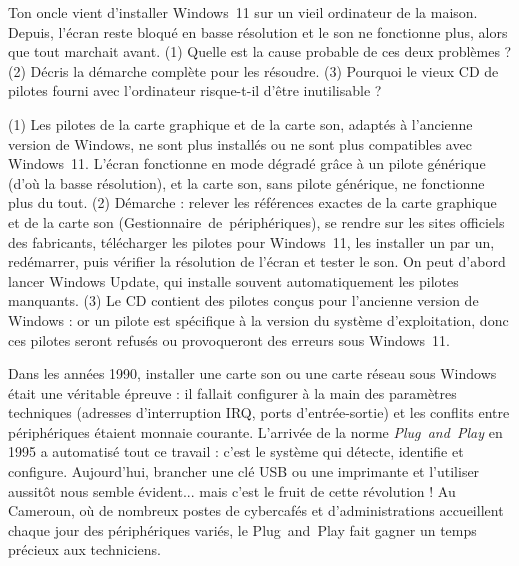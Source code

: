 \documentclass[11pt]{article}
\begin{document}
\begin{exercice}
Ton oncle vient d'installer Windows~11 sur un vieil ordinateur de la maison. Depuis, l'écran reste bloqué en basse résolution et le son ne fonctionne plus, alors que tout marchait avant. (1) Quelle est la cause probable de ces deux problèmes ? (2) Décris la démarche complète pour les résoudre. (3) Pourquoi le vieux CD de pilotes fourni avec l'ordinateur risque-t-il d'être inutilisable ?
\end{exercice}

\begin{corrige}[Exercice 1]
(1) Les pilotes de la carte graphique et de la carte son, adaptés à l'ancienne version de Windows, ne sont plus installés ou ne sont plus compatibles avec Windows~11. L'écran fonctionne en mode dégradé grâce à un pilote générique (d'où la basse résolution), et la carte son, sans pilote générique, ne fonctionne plus du tout. (2) Démarche : relever les références exactes de la carte graphique et de la carte son (Gestionnaire~de~périphériques), se rendre sur les sites officiels des fabricants, télécharger les pilotes pour Windows~11, les installer un par un, redémarrer, puis vérifier la résolution de l'écran et tester le son. On peut d'abord lancer Windows Update, qui installe souvent automatiquement les pilotes manquants. (3) Le CD contient des pilotes conçus pour l'ancienne version de Windows : or un pilote est spécifique à la version du système d'exploitation, donc ces pilotes seront refusés ou provoqueront des erreurs sous Windows~11.
\end{corrige}

\begin{savaistu}
Dans les années 1990, installer une carte son ou une carte réseau sous Windows était une véritable épreuve : il fallait configurer à la main des paramètres techniques (adresses d'interruption IRQ, ports d'entrée-sortie) et les conflits entre périphériques étaient monnaie courante. L'arrivée de la norme \emph{Plug~and~Play} en 1995 a automatisé tout ce travail : c'est le système qui détecte, identifie et configure. Aujourd'hui, brancher une clé USB ou une imprimante et l'utiliser aussitôt nous semble évident... mais c'est le fruit de cette révolution ! Au Cameroun, où de nombreux postes de cybercafés et d'administrations accueillent chaque jour des périphériques variés, le Plug~and~Play fait gagner un temps précieux aux techniciens.
\end{savaistu}
\end{document}
